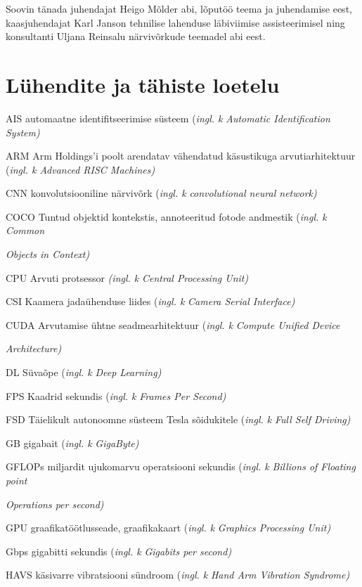 \documentclass[12pt,a4paper]{report}
\begin{document}
Soovin tänada juhendajat Heigo Mõlder abi, lõputöö teema ja juhendamise eest, kaasjuhendajat Karl Janson tehnilise lahenduse läbiviimise assisteerimisel ning konsultanti Uljana Reinsalu närvivõrkude teemadel abi eest.

\section*{Lühendite ja tähiste loetelu}\label{luxfchendite-ja-tuxe4histe-loetelu}

AIS automaatne identifitseerimise süsteem (\emph{ingl. k} \emph{Automatic Identification System)}

ARM Arm Holdings'i poolt arendatav vähendatud käsustikuga arvutiarhitektuur (\emph{ingl. k Advanced RISC Machines)}

CNN konvolutsiooniline närvivõrk (\emph{ingl. k} \emph{convolutional neural network)}

COCO Tuntud objektid kontekstis, annoteeritud fotode andmestik (\emph{ingl. k} \emph{Common}

\emph{Objects in Context)}

CPU Arvuti protsessor \emph{(ingl. k} \emph{Central Processing Unit)}

CSI Kaamera jadaühenduse liides (\emph{ingl. k} \emph{Camera Serial Interface)}

CUDA Arvutamise ühtne seadmearhitektuur (\emph{ingl. k} \emph{Compute Unified Device}

\emph{Architecture)}

DL Süvaõpe (\emph{ingl. k} \emph{Deep Learning)}

FPS Kaadrid sekundis (\emph{ingl. k} \emph{Frames Per Second)}

FSD Täielikult autonoomne süsteem Tesla sõidukitele (\emph{ingl. k} \emph{Full Self Driving)}

GB gigabait (\emph{ingl. k} \emph{GigaByte)}

GFLOPs miljardit ujukomarvu operatsiooni sekundis (\emph{ingl. k} \emph{Billions of Floating point}

\emph{Operations per second)}

GPU graafikatöötlusseade, graafikakaart (\emph{ingl. k} \emph{Graphics Processing Unit)}

Gbps gigabitti sekundis (\emph{ingl. k} \emph{Gigabits per second)}

HAVS käsivarre vibratsiooni sündroom (\emph{ingl. k} \emph{Hand Arm Vibration Syndrome)}
\end{document}
